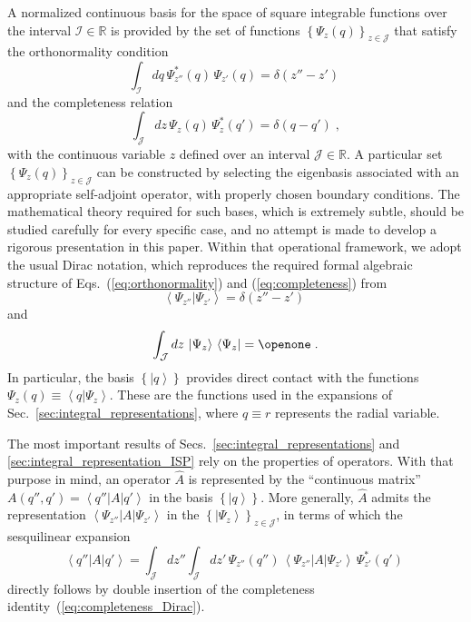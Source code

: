 \documentclass[a4paper,preprint,draft,showpacs,amsmath,amsfonts,amssymb,aps,prd]{revtex4}%
\begin{document}
A normalized continuous basis
for the space of square integrable functions over the interval
${\mathcal I} \in 
\mathbb{R} $
is provided by the set of
functions $\left\{ \Psi_{z} (q) \right\}_{z \in {\mathcal J}}$
that satisfy the orthonormality condition
\begin{equation}
\int_{\mathcal I}
dq
\,
\Psi_{z''}^{*}(q) \, \Psi_{z'} (q)
=\delta (z''-z')
\;
\label{eq:orthonormality}
\end{equation}
and
the completeness relation
\begin{equation}
\int_{\mathcal J}
dz 
\,
\Psi_{z} (q) \, \Psi_{z}^{*} (q')
= \delta (q-q')
\;  ,
\label{eq:completeness}
\end{equation} 
with the continuous
variable $z$ defined over an interval
${\mathcal J} \in  \mathbb{R} $.
A particular set
$\left\{ \Psi_{z} (q) \right\}_{z \in {\mathcal J}}$ can be constructed
by selecting the eigenbasis associated with an appropriate self-adjoint operator,
with properly chosen boundary conditions.
The mathematical theory required for such bases, which is extremely subtle,
should be studied carefully for every specific case,
and no attempt is made to develop a rigorous presentation in this paper.
Within that operational 
framework, we adopt the usual 
Dirac notation, which reproduces 
the required formal algebraic structure of
Eqs.~(\ref{eq:orthonormality}) 
and (\ref{eq:completeness}) from
\begin{equation}
\left\langle 
\Psi_{z''} 
|
\Psi_{z'} 
\right\rangle
= \delta (z''-z')
\;
\label{eq:orthonormality_Dirac}
\end{equation}
and
\begin{equation}
\int_{\mathcal J}
dz 
\,
\left|
\Psi_{z} 
\right\rangle
\,
\left\langle 
\Psi_{z} 
\right|
=
\openone
\;  .
\label{eq:completeness_Dirac}
\end{equation} 
In particular, the  basis $\left\{ \left| q  \right\rangle \right\}$
provides direct contact with
the functions $\Psi_{z} (q) \equiv \left\langle q| \Psi_{z} \right\rangle$.
 These are the functions used in the expansions of
 Sec.~\ref{sec:integral_representations},
where $q \equiv r$ represents the radial variable.

The most important results of Secs.~\ref{sec:integral_representations} and 
\ref{sec:integral_representation_ISP}
rely on the properties of operators. With that purpose in mind, an
operator $\hat{A}$ is represented by the ``continuous matrix''
$A(q'',q') =
\left\langle
 q'' |A| q'
\right\rangle
$  in the basis $\left\{ \left| q  \right\rangle \right\}$.
More generally, $\hat{A}$ admits the representation
$\left\langle
\Psi_{z''}
 |A| 
\Psi_{z'}
\right\rangle
$
in the
$\left\{  \left| \Psi_{z} \right\rangle
 \right\}_{z \in {\mathcal J}}$,
 in terms of which the sesquilinear expansion 
\begin{equation}
\left\langle 
q'' |A| q'
\right\rangle
=
\int_{\mathcal J}
dz'' 
\int_{\mathcal J}
dz' 
\,
\Psi_{z''} (q'')
\,
\left\langle
\Psi_{z''}
 |A| 
\Psi_{z'}
\right\rangle
\,
\Psi_{z'}^{*}(q') 
\;
\label{eq:sesquilinear}
\end{equation}
directly follows
by double insertion of the completeness identity~(\ref{eq:completeness_Dirac}).
\end{document}
